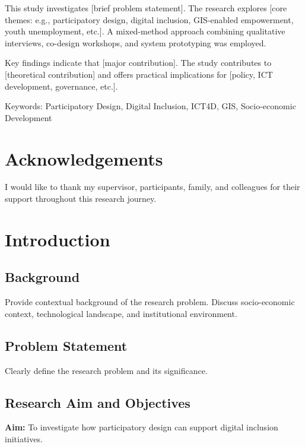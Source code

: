 \documentclass[12pt,a4paper,oneside]{report}
\begin{document}
This study investigates [brief problem statement]. The research explores [core themes: e.g., participatory design, digital inclusion, GIS-enabled empowerment, youth unemployment, etc.]. A mixed-method approach combining qualitative interviews, co-design workshops, and system prototyping was employed.

Key findings indicate that [major contribution]. The study contributes to [theoretical contribution] and offers practical implications for [policy, ICT development, governance, etc.].

Keywords: Participatory Design, Digital Inclusion, ICT4D, GIS, Socio-economic Development

\chapter*{Acknowledgements}

I would like to thank my supervisor, participants, family, and colleagues for their support throughout this research journey.

\tableofcontents
\listoffigures
\listoftables
\newpage

\chapter{Introduction}

\section{Background}
Provide contextual background of the research problem. Discuss socio-economic context, technological landscape, and institutional environment.

\section{Problem Statement}
Clearly define the research problem and its significance.

\section{Research Aim and Objectives}
\textbf{Aim:} To investigate how participatory design can support digital inclusion initiatives.
\end{document}

